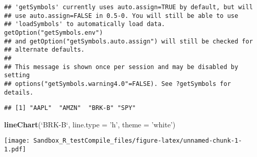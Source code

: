 \documentclass[]{article}
\newenvironment{Shaded}{\begin{snugshade}}{\end{snugshade}}
\newcommand{\KeywordTok}[1]{\textcolor[rgb]{0.13,0.29,0.53}{\textbf{#1}}}
\newcommand{\DataTypeTok}[1]{\textcolor[rgb]{0.13,0.29,0.53}{#1}}
\newcommand{\StringTok}[1]{\textcolor[rgb]{0.31,0.60,0.02}{#1}}
\newcommand{\NormalTok}[1]{#1}
\begin{document}
\begin{verbatim}
## 'getSymbols' currently uses auto.assign=TRUE by default, but will
## use auto.assign=FALSE in 0.5-0. You will still be able to use
## 'loadSymbols' to automatically load data. getOption("getSymbols.env")
## and getOption("getSymbols.auto.assign") will still be checked for
## alternate defaults.
## 
## This message is shown once per session and may be disabled by setting 
## options("getSymbols.warning4.0"=FALSE). See ?getSymbols for details.
\end{verbatim}

\begin{verbatim}
## [1] "AAPL"  "AMZN"  "BRK-B" "SPY"
\end{verbatim}

\begin{Shaded}
\begin{Highlighting}[]
\KeywordTok{lineChart}\NormalTok{(}\StringTok{`}\DataTypeTok{BRK-B}\StringTok{`}\NormalTok{, }\DataTypeTok{line.type =} \StringTok{'h'}\NormalTok{, }\DataTypeTok{theme =} \StringTok{'white'}\NormalTok{)}
\end{Highlighting}
\end{Shaded}

\texttt{[image: Sandbox\_R\_testCompile\_files/figure-latex/unnamed-chunk-1-1.pdf]}
\end{document}
